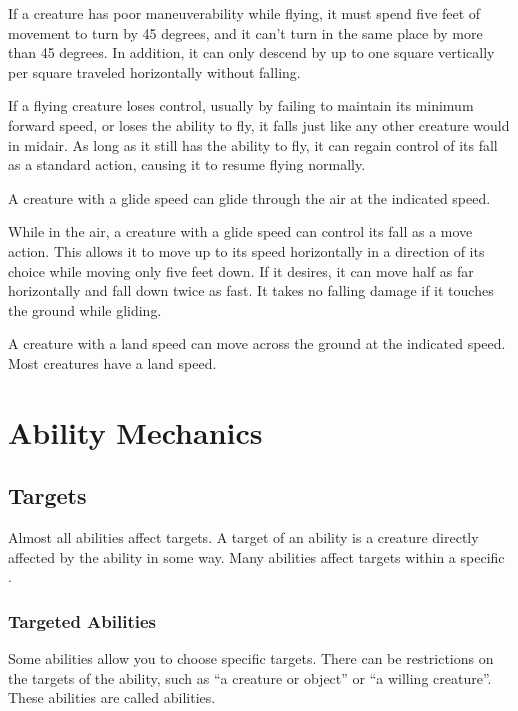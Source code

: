          If a creature has poor maneuverability while flying, it must spend five feet of movement to turn by 45 degrees, and it can't turn in the same place by more than 45 degrees. In addition, it can only descend by up to one square vertically per square traveled horizontally without falling.

         If a flying creature loses control, usually by failing to maintain its minimum forward speed, or loses the ability to fly, it falls just like any other creature would in midair. As long as it still has the ability to fly, it can regain control of its fall as a standard action, causing it to resume flying normally.

        \label{Gliding}
        A creature with a glide speed can glide through the air at the indicated speed.

        While in the air, a creature with a glide speed can control its fall as a move action. This allows it to move up to its speed horizontally in a direction of its choice while moving only five feet down. If it desires, it can move half as far horizontally and fall down twice as fast. It takes no falling damage if it touches the ground while gliding.

        A creature with a land speed can move across the ground at the indicated speed.
        Most creatures have a land speed.

\section{Ability Mechanics}\label{Ability Mechanics}

    \subsection{Targets}\label{Targets}
        Almost all abilities affect targets.
        A target of an ability is a creature directly affected by the ability in some way.
        Many abilities affect targets within a specific .

        \subsubsection{Targeted Abilities}\label{Targeted Abilities}
            Some abilities allow you to choose specific targets.
            There can be restrictions on the targets of the ability, such as ``a creature or object'' or ``a willing creature''.
            These abilities are called  abilities.

